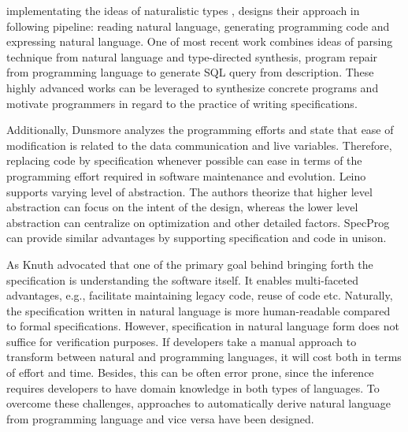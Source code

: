 \documentclass[11pt]{article}
\begin{document}
implementating the ideas of naturalistic types \cite{Knoll:2011}, designs their approach in following pipeline: reading natural language, generating programming code and expressing natural language. One of most recent work \cite{Yaghmazadeh:2017} combines ideas of parsing technique from natural language and type-directed synthesis, program repair from programming language to generate SQL query from description. These highly advanced works can be leveraged to synthesize concrete programs and motivate programmers in regard to the practice of writing specifications.

Additionally, Dunsmore \etal \cite{Dunsmore:1984} analyzes the programming efforts and state that ease of modification is related to the data communication and live variables. Therefore, replacing code by specification whenever possible can ease in terms of the programming effort required in software maintenance and evolution. Leino \etal \cite{Leino:2012} supports varying level of abstraction. The authors theorize that higher level abstraction can focus on the intent of the design, whereas the lower level abstraction can centralize on optimization and other detailed factors. SpecProg can provide similar advantages by supporting specification and code in unison.

As Knuth \cite{Knuth:1984} advocated that one of the primary goal behind bringing forth the specification is understanding the software itself. It enables multi-faceted advantages, e.g., facilitate maintaining legacy code, reuse of code etc. Naturally, the specification written in natural language is more human-readable compared to formal specifications. However, specification in natural language form does not suffice for verification purposes. If developers take a manual approach to transform between natural and programming languages, it will cost both in terms of effort and time. Besides, this can be often error prone, since the inference requires developers to have domain knowledge in both types of languages. To overcome these challenges, approaches to automatically derive natural language from programming language and vice versa have been designed.
\end{document}
